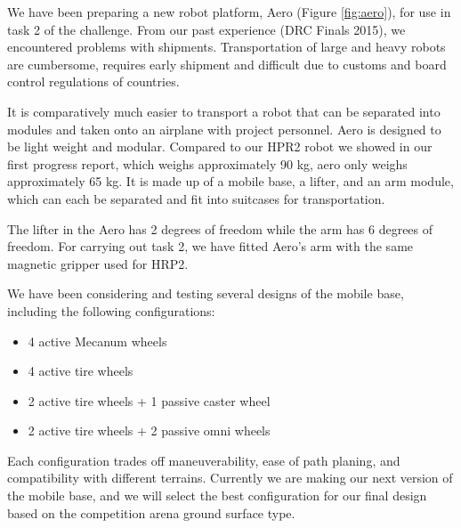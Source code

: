 \documentclass{standalone}
\begin{document}
We have been preparing a new robot platform, Aero (Figure
\ref{fig:aero}), for use in task 2 of the challenge. From our past
experience (DRC Finals 2015), we encountered problems
with shipments. Transportation of large and heavy robots are
cumbersome, requires early shipment and difficult due to customs and
board control regulations of countries. 




It is comparatively much easier to transport a robot that
can be separated into modules and taken onto an airplane with project personnel.
Aero is designed to be light weight and modular. Compared to 
our HPR2 robot we showed in our first progress report, which weighs
approximately 90 kg, aero only weighs approximately 65 kg. It is 
made up of a mobile base, a lifter, and an arm module, which can each 
be separated and fit into suitcases for transportation. 


The lifter in the Aero has 2 degrees of freedom while the arm has 6 degrees
of freedom. For carrying out task 2, we have fitted Aero's arm
with the same magnetic gripper used for HRP2. 




We have been considering and testing several designs of the mobile base, including the following configurations:
\begin{itemize}
	\item 4 active Mecanum wheels 
	\item 4 active tire wheels
	\item 2 	active tire wheels + 1 passive caster wheel
	\item 2 	active tire wheels + 2 passive omni wheels
\end{itemize}

Each configuration trades off maneuverability, ease of path planing,
and compatibility with different terrains. Currently we are making our
next version of the mobile base, and we will select the best
configuration for our final design based on the competition arena
ground surface type. 
\end{document}
